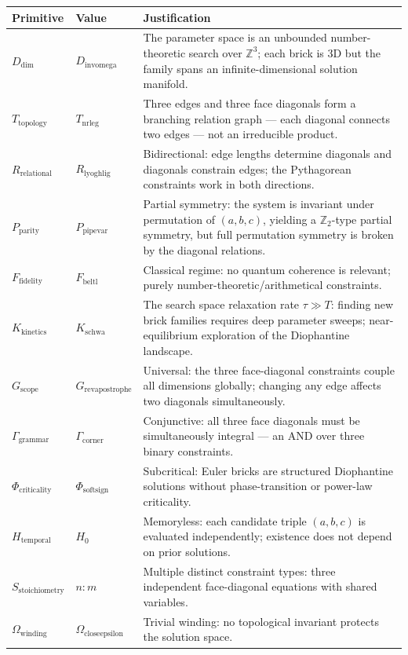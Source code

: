 \documentclass[10pt,a4paper]{article}
\begin{document}
\begin{table}[htbp]
\centering
\small
{}
\begin{tabularx}{\textwidth}{>{\centering\arraybackslash}X >{\centering\arraybackslash}X >{\centering\arraybackslash}X}
\toprule
\rowcolor{gray!25}\textbf{Primitive} & \textbf{Value} & \textbf{Justification} \\
\midrule
\rowcolors{1}{white}{gray!10}
$D_\text{dim}$ & $D_{\text{invomega}}$ & The parameter space is an unbounded number-theoretic search over $\mathbb{Z}^3$; each brick is 3D but the family spans an infinite-dimensional solution manifold. \\
$T_\text{topology}$ & $T_{\text{nrleg}}$ & Three edges and three face diagonals form a branching relation graph --- each diagonal connects two edges --- not an irreducible product. \\
$R_\text{relational}$ & $R_{\text{lyoghlig}}$ & Bidirectional: edge lengths determine diagonals and diagonals constrain edges; the Pythagorean constraints work in both directions. \\
$P_\text{parity}$ & $P_{\text{pipevar}}$ & Partial symmetry: the system is invariant under permutation of $(a,b,c)$, yielding a $\mathbb{Z}_2$-type partial symmetry, but full permutation symmetry is broken by the diagonal relations. \\
$F_\text{fidelity}$ & $F_{\text{beltl}}$ & Classical regime: no quantum coherence is relevant; purely number-theoretic/arithmetical constraints. \\
$K_\text{kinetics}$ & $K_{\text{schwa}}$ & The search space relaxation rate $\tau \gg T$: finding new brick families requires deep parameter sweeps; near-equilibrium exploration of the Diophantine landscape. \\
$G_\text{scope}$ & $G_{\text{revapostrophe}}$ & Universal: the three face-diagonal constraints couple all dimensions globally; changing any edge affects two diagonals simultaneously. \\
$\Gamma_\text{grammar}$ & $\Gamma_{\text{corner}}$ & Conjunctive: all three face diagonals must be simultaneously integral --- an AND over three binary constraints. \\
$\Phi_\text{criticality}$ & $\Phi_{\text{softsign}}$ & Subcritical: Euler bricks are structured Diophantine solutions without phase-transition or power-law criticality. \\
$H_\text{temporal}$ & $H_0$ & Memoryless: each candidate triple $(a,b,c)$ is evaluated independently; existence does not depend on prior solutions. \\
$S_\text{stoichiometry}$ & $n{:}m$ & Multiple distinct constraint types: three independent face-diagonal equations with shared variables. \\
$\Omega_\text{winding}$ & $\Omega_{\text{closeepsilon}}$ & Trivial winding: no topological invariant protects the solution space. \\
\bottomrule
\end{tabularx}
\end{table}
\end{document}
